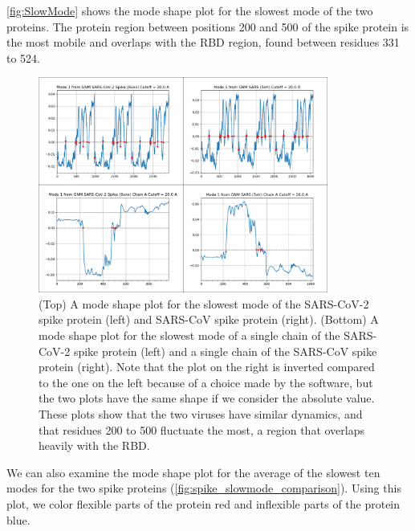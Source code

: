 \autoref{fig:SlowMode} shows the mode shape plot for the slowest mode of the two proteins. The protein region between positions 200 and 500 of the spike protein is the most mobile and overlaps with the RBD region, found between residues 331 to 524.\\

\begin{figure}[h]
	\centering
	\mySfFamily
	\includegraphics[width = 0.85\textwidth]{../images/SlowMode.png}
	\caption{(Top) A mode shape plot for the slowest mode of the SARS-CoV-2 spike protein (left) and SARS-CoV spike protein (right). (Bottom) A mode shape plot for the slowest mode of a single chain of the SARS-CoV-2 spike protein (left) and a single chain of the SARS-CoV spike protein (right). Note that the plot on the right is inverted compared to the one on the left because of a choice made by the software, but the two plots have the same shape if we consider the absolute value. These plots show that the two viruses have similar dynamics, and that residues 200 to 500 fluctuate the most, a region that overlaps heavily with the RBD.}
	\label{fig:SlowMode}
\end{figure}

We can also examine the mode shape plot for the average of the slowest ten modes for the two spike proteins (\autoref{fig:spike_slowmode_comparison}). Using this plot, we color flexible parts of the protein red and inflexible parts of the protein blue.\\

